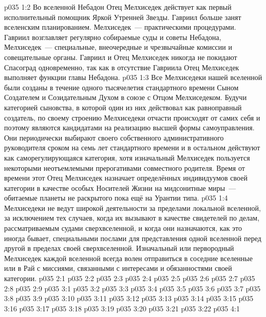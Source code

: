 \vs p035 1:2 Во вселенной Небадон Отец Мелхиседек действует как первый исполнительный помощник Яркой Утренней Звезды. Гавриил больше занят вселенским планированием. Мелхиседек~--- практическими процедурами. Гавриил возглавляет регулярно собираемые суды и советы Небадона, Мелхиседек~--- специальные, внеочередные и чрезвычайные комиссии и совещательные органы. Гавриил и Отец Мелхиседек никогда не покидают Спасоград одновременно, так как в отсутствие Гавриила Отец Мелхиседек выполняет функции главы Небадона.
\vs p035 1:3 Все Мелхиседеки нашей вселенной были созданы в течение одного тысячелетия стандартного времени Сыном Создателем и Созидательным Духом в союзе с Отцом Мелхиседеком. Будучи категорией сыновства, в которой один из них действовал как равноправный создатель, по своему строению Мелхиседеки отчасти происходят от самих себя и поэтому являются кандидатами на реализацию высшей формы самоуправления. Они периодически выбирают своего собственного административного руководителя сроком на семь лет стандартного времени и в остальном действуют как саморегулирующаяся категория, хотя изначальный Мелхиседек пользуется некоторыми неотъемлемыми прерогативами совместного родителя. Время от времени этот Отец Мелхиседек назначает определённых индивидуумов своей категории в качестве особых Носителей Жизни на мидсонитные миры~--- обитаемые планеты не раскрытого пока ещё на Урантии типа.
\vs p035 1:4 Мелхиседеки не ведут широкой деятельности за пределами локальной вселенной, за исключением тех случаев, когда их вызывают в качестве свидетелей по делам, рассматриваемым судами сверхвселенной, и когда они назначаются, как это иногда бывает, специальными послами для представления одной вселенной перед другой в пределах своей сверхвселенной. Изначальный или первородный Мелхиседек каждой вселенной всегда волен отправиться в соседние вселенные или в Рай с миссиями, связанными с интересами и обязанностями своей категории.
\vs p035 2:1 
\vs p035 2:2 
\vs p035 2:3 \pc 
\vs p035 2:4 
\vs p035 2:5 
\vs p035 2:6 
\vs p035 2:7 
\vs p035 2:8 \pc 
\vs p035 2:9 
\vs p035 3:1 
\vs p035 3:2 
\vs p035 3:3 
\vs p035 3:4 
\vs p035 3:5 
\vs p035 3:6 
\vs p035 3:7 
\vs p035 3:8 
\vs p035 3:9 
\vs p035 3:10 \pc 
\vs p035 3:11 \pc 
\vs p035 3:12 
\vs p035 3:13 \pc 
\vs p035 3:14 
\vs p035 3:15 
\vs p035 3:16 
\vs p035 3:17 
\vs p035 3:18 
\vs p035 3:19 
\vs p035 3:20 \pc 
\vs p035 3:21 
\vs p035 3:22 
\vs p035 4:1 
